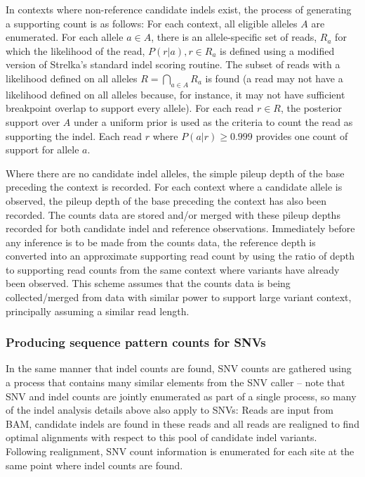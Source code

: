 \documentclass{article}
\begin{document}
In contexts where non-reference candidate indels exist, the process of generating a supporting count is as follows: For each context, all eligible alleles $A$ are enumerated. For each allele $a \in A$, there is an allele-specific set of reads, $R_a$ for which the likelihood of the read, $P( r \vert a ), r \in R_a$ is defined using a modified version of Strelka's standard indel scoring routine. The subset of reads with a likelihood defined on all alleles $R = \bigcap_{a \in A} R_a$ is found (a read may not have a likelihood defined on all alleles because, for instance, it may not have sufficient breakpoint overlap to support every allele). For each read $r \in R$, the posterior support over $A$ under a uniform prior is used as the criteria to count the read as supporting the indel. Each read $r$ where $P( a \vert r ) \geq 0.999$ provides one count of support for allele $a$.

Where there are no candidate indel alleles, the simple pileup depth of the base preceding the context is recorded. For each context where a candidate allele is observed, the pileup depth of the base preceding the context has also been recorded. The counts data are stored and/or merged with these pileup depths recorded for both candidate indel and reference observations. Immediately before any inference is to be made from the counts data, the reference depth is converted into an approximate supporting read count by using the ratio of depth to supporting read counts from the same context where variants have already been observed. This scheme assumes that the counts data is being collected/merged from data with similar power to support large variant context, principally assuming a similar read length.

\subsubsection{Producing sequence pattern counts for SNVs}

In the same manner that indel counts are found, SNV counts are gathered using a process that contains many similar elements from the SNV caller -- note that SNV and indel counts are jointly enumerated as part of a single process, so many of the indel analysis details above also apply to SNVs: Reads are input from BAM, candidate indels are found in these reads and all reads are realigned to find optimal alignments with respect to this pool of candidate indel variants. Following realignment, SNV count information is enumerated for each site at the same point where indel counts are found.
\end{document}
